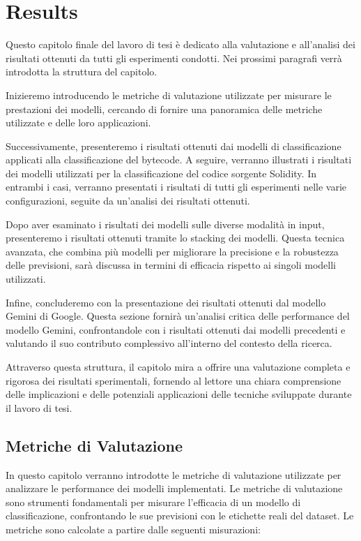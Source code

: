 \documentclass[../../Thesis.tex]{subfiles}
\begin{document}
\chapter{Results}
\label{chap:results}
Questo capitolo finale del lavoro di tesi è dedicato alla valutazione e all'analisi dei risultati ottenuti da tutti gli esperimenti condotti. Nei prossimi paragrafi verrà introdotta la struttura del capitolo. 

Inizieremo introducendo le metriche di valutazione utilizzate per misurare le prestazioni dei modelli, cercando di fornire una panoramica delle metriche utilizzate e delle loro applicazioni. 

Successivamente, presenteremo i risultati ottenuti dai modelli di classificazione applicati alla classificazione del bytecode. 
A seguire, verranno illustrati i risultati dei modelli utilizzati per la classificazione del codice sorgente Solidity. In entrambi i casi, verranno presentati i risultati di tutti gli esperimenti nelle varie configurazioni, seguite da un'analisi dei risultati ottenuti.

Dopo aver esaminato i risultati dei modelli sulle diverse modalità in input, presenteremo i risultati ottenuti tramite lo stacking dei modelli. Questa tecnica avanzata, che combina più modelli per migliorare la precisione e la robustezza delle previsioni, sarà discussa in termini di efficacia rispetto ai singoli modelli utilizzati.

Infine, concluderemo con la presentazione dei risultati ottenuti dal modello Gemini di Google. Questa sezione fornirà un'analisi critica delle performance del modello Gemini, confrontandole con i risultati ottenuti dai modelli precedenti e valutando il suo contributo complessivo all'interno del contesto della ricerca.

Attraverso questa struttura, il capitolo mira a offrire una valutazione completa e rigorosa dei risultati sperimentali, fornendo al lettore una chiara comprensione delle implicazioni e delle potenziali applicazioni delle tecniche sviluppate durante il lavoro di tesi.
\section{Metriche di Valutazione}

In questo capitolo verranno introdotte le metriche di valutazione utilizzate per analizzare le performance dei modelli implementati. Le metriche di valutazione sono strumenti fondamentali per misurare l'efficacia di un modello di classificazione, confrontando le sue previsioni con le etichette reali del dataset. Le metriche sono calcolate a partire dalle seguenti misurazioni:
\end{document}
